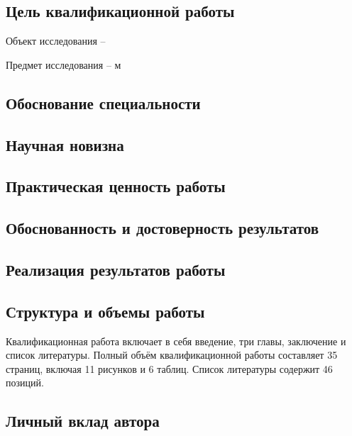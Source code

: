 \subsection*{Цель квалификационной работы}




Объект исследования –

Предмет исследования – м

\subsection*{Обоснование специальности}

\subsection*{Научная новизна}

\subsection*{Практическая ценность работы}

\subsection*{Обоснованность и достоверность результатов}


\subsection*{Реализация результатов работы}

\subsection*{Структура и объемы работы}

Квалификационная работа включает в себя введение, три главы, заключение и список литературы.
Полный объём квалификационной работы составляет 35 страниц, включая 11 рисунков и 6 таблиц.
Список литературы содержит 46 позиций.

\subsection*{Личный вклад автора}
